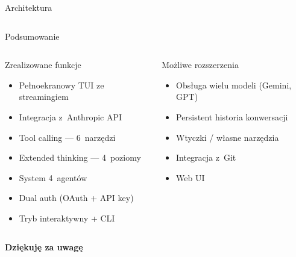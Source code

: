 \documentclass[aspectratio=169]{beamer}
\begin{document}
\begin{frame}{Architektura}
\begin{columns}[T]
\begin{center}
        \end{center}
    \end{columns}
\end{frame}

\begin{frame}{Podsumowanie}
    \begin{columns}[T]
        \begin{block}{Zrealizowane funkcje}
            \begin{itemize}\setlength{\itemsep}{1pt}
                \item Pełnoekranowy TUI ze streamingiem
                \item Integracja z~Anthropic API
                \item Tool calling --- 6~narzędzi
                \item Extended thinking --- 4~poziomy
                \item System 4~agentów
                \item Dual auth (OAuth + API key)
                \item Tryb interaktywny + CLI
            \end{itemize}
        \end{block}

        \begin{block}{Możliwe rozszerzenia}
            \begin{itemize}\setlength{\itemsep}{1pt}
                \item Obsługa wielu modeli (Gemini, GPT)
                \item Persistent historia konwersacji
                \item Wtyczki / własne narzędzia
                \item Integracja z~Git
                \item Web UI
            \end{itemize}
        \end{block}
    \end{columns}

    \vspace{0.4cm}
    \begin{center}
        \Large\textbf{Dziękuję za uwagę}

        \vspace{0.2cm}
    \end{center}
\end{frame}
\end{document}
